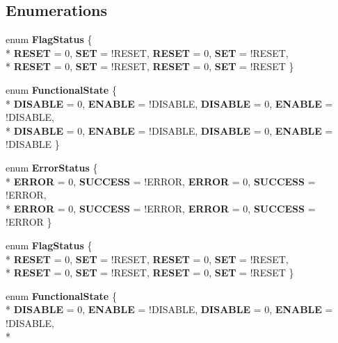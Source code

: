 \subsection*{Enumerations}
\begin{DoxyCompactItemize}
\item 
enum {\bfseries Flag\-Status} \{ \\*
{\bfseries R\-E\-S\-E\-T} = 0, 
{\bfseries S\-E\-T} = !\-R\-E\-S\-E\-T, 
{\bfseries R\-E\-S\-E\-T} = 0, 
{\bfseries S\-E\-T} = !\-R\-E\-S\-E\-T, 
\\*
{\bfseries R\-E\-S\-E\-T} = 0, 
{\bfseries S\-E\-T} = !\-R\-E\-S\-E\-T, 
{\bfseries R\-E\-S\-E\-T} = 0, 
{\bfseries S\-E\-T} = !\-R\-E\-S\-E\-T
 \}
\item 
enum {\bfseries Functional\-State} \{ \\*
{\bfseries D\-I\-S\-A\-B\-L\-E} = 0, 
{\bfseries E\-N\-A\-B\-L\-E} = !\-D\-I\-S\-A\-B\-L\-E, 
{\bfseries D\-I\-S\-A\-B\-L\-E} = 0, 
{\bfseries E\-N\-A\-B\-L\-E} = !\-D\-I\-S\-A\-B\-L\-E, 
\\*
{\bfseries D\-I\-S\-A\-B\-L\-E} = 0, 
{\bfseries E\-N\-A\-B\-L\-E} = !\-D\-I\-S\-A\-B\-L\-E, 
{\bfseries D\-I\-S\-A\-B\-L\-E} = 0, 
{\bfseries E\-N\-A\-B\-L\-E} = !\-D\-I\-S\-A\-B\-L\-E
 \}
\item 
enum {\bfseries Error\-Status} \{ \\*
{\bfseries E\-R\-R\-O\-R} = 0, 
{\bfseries S\-U\-C\-C\-E\-S\-S} = !\-E\-R\-R\-O\-R, 
{\bfseries E\-R\-R\-O\-R} = 0, 
{\bfseries S\-U\-C\-C\-E\-S\-S} = !\-E\-R\-R\-O\-R, 
\\*
{\bfseries E\-R\-R\-O\-R} = 0, 
{\bfseries S\-U\-C\-C\-E\-S\-S} = !\-E\-R\-R\-O\-R, 
{\bfseries E\-R\-R\-O\-R} = 0, 
{\bfseries S\-U\-C\-C\-E\-S\-S} = !\-E\-R\-R\-O\-R
 \}
\item 
enum {\bfseries Flag\-Status} \{ \\*
{\bfseries R\-E\-S\-E\-T} = 0, 
{\bfseries S\-E\-T} = !\-R\-E\-S\-E\-T, 
{\bfseries R\-E\-S\-E\-T} = 0, 
{\bfseries S\-E\-T} = !\-R\-E\-S\-E\-T, 
\\*
{\bfseries R\-E\-S\-E\-T} = 0, 
{\bfseries S\-E\-T} = !\-R\-E\-S\-E\-T, 
{\bfseries R\-E\-S\-E\-T} = 0, 
{\bfseries S\-E\-T} = !\-R\-E\-S\-E\-T
 \}
\item 
enum {\bfseries Functional\-State} \{ \\*
{\bfseries D\-I\-S\-A\-B\-L\-E} = 0, 
{\bfseries E\-N\-A\-B\-L\-E} = !\-D\-I\-S\-A\-B\-L\-E, 
{\bfseries D\-I\-S\-A\-B\-L\-E} = 0, 
{\bfseries E\-N\-A\-B\-L\-E} = !\-D\-I\-S\-A\-B\-L\-E, 
\\*

\end{DoxyCompactItemize}
